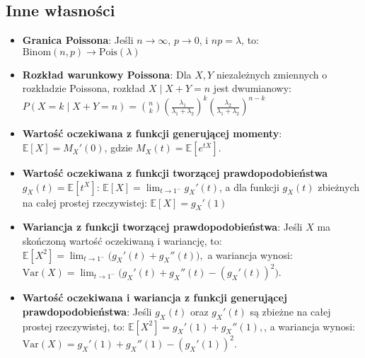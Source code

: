 \documentclass{article}
\theoremstyle{definition}
\theoremstyle{remark}
\begin{document}
\begin{multicols}{2}
    \section*{Inne własności}
    \begin{itemize}
    
    \item \textbf{Granica Poissona}: Jeśli \( n \to \infty \), \( p \to 0 \), i \( np = \lambda \), to: \(\text{Binom}(n, p) \to \text{Pois}(\lambda)\)
    
    \item \textbf{Rozkład warunkowy Poissona}: Dla \( X, Y \) niezależnych zmiennych o rozkładzie Poissona, rozkład \( X \mid X + Y = n \) jest dwumianowy:
    \(
    P(X = k \mid X + Y = n) = \binom{n}{k} \left( \frac{\lambda_1}{\lambda_1 + \lambda_2} \right)^k \left( \frac{\lambda_2}{\lambda_1 + \lambda_2} \right)^{n-k}
    \)
    
    \item \textbf{Wartość oczekiwana z funkcji generującej momenty}: \(\mathbb{E}[X] = M_X'(0)\), gdzie \( M_X(t) = \mathbb{E}[e^{tX}] \).
    
    \item \textbf{Wartość oczekiwana z funkcji tworzącej prawdopodobieństwa} \( g_X(t) = \mathbb{E}[t^X] \): \(\mathbb{E}[X] = \lim_{t \to 1^-} g_X'(t)\), 
    a dla funkcji \( g_X(t) \) zbieżnych na całej prostej rzeczywistej: \(\mathbb{E}[X] = g_X'(1)\)
    
    \item \textbf{Wariancja z funkcji tworzącej prawdopodobieństwa}: 
    Jeśli \( X \) ma skończoną wartość oczekiwaną i wariancję, to:
    \(
    \mathbb{E}[X^2] = \lim_{t \to 1^-} \big(g_X'(t) + g_X''(t)\big),
    \)
    a wariancja wynosi:
    \(
    \mathrm{Var}(X) = \lim_{t \to 1^-} \big(g_X'(t) + g_X''(t) - (g_X'(t))^2\big).
    \)
    
    \item \textbf{Wartość oczekiwana i wariancja z funkcji generującej prawdopodobieństwa}: 
    Jeśli \( g_X(t) \) oraz \( g_X'(t) \) są zbieżne na całej prostej rzeczywistej, to:
    \(
    \mathbb{E}[X^2] = g_X'(1) + g_X''(1),
    \), a wariancja wynosi:
    \(
    \text{Var}(X) = g_X'(1) + g_X''(1) - (g_X'(1))^2.
    \)
    
    \end{itemize}




\end{multicols}
\end{document}
